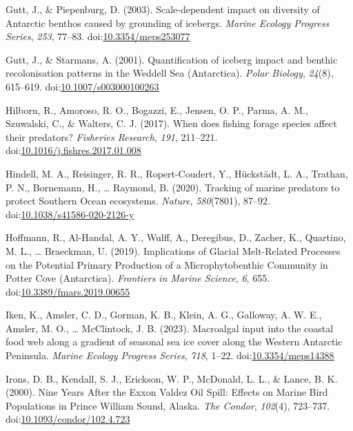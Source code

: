 \documentclass[
]{article}
\newlength{\cslhangindent}
\newenvironment{CSLReferences}[2] %
 {\begin{list}{}{%
  \setlength{\itemindent}{0pt}
  \setlength{\leftmargin}{0pt}
  \setlength{\parsep}{0pt}
  \ifodd #1
   \setlength{\leftmargin}{\cslhangindent}
   \setlength{\itemindent}{-1\cslhangindent}
  \fi
  \setlength{\itemsep}{#2\baselineskip}}}
 {\end{list}}
\begin{document}
\begin{CSLReferences}{1}{0}
Gutt, J., \& Piepenburg, D. (2003). Scale-dependent impact on diversity
of {Antarctic} benthos caused by grounding of icebergs. \emph{Marine
Ecology Progress Series}, \emph{253}, 77--83.
doi:\href{https://doi.org/10.3354/meps253077}{10.3354/meps253077}

Gutt, J., \& Starmans, A. (2001). Quantification of iceberg impact and
benthic recolonisation patterns in the {Weddell Sea} ({Antarctica}).
\emph{Polar Biology}, \emph{24}(8), 615--619.
doi:\href{https://doi.org/10.1007/s003000100263}{10.1007/s003000100263}

Hilborn, R., Amoroso, R. O., Bogazzi, E., Jensen, O. P., Parma, A. M.,
Szuwalski, C., \& Walters, C. J. (2017). When does fishing forage
species affect their predators? \emph{Fisheries Research}, \emph{191},
211--221.
doi:\href{https://doi.org/10.1016/j.fishres.2017.01.008}{10.1016/j.fishres.2017.01.008}

Hindell, M. A., Reisinger, R. R., Ropert-Coudert, Y., Hückstädt, L. A.,
Trathan, P. N., Bornemann, H., \ldots{} Raymond, B. (2020). Tracking of
marine predators to protect {Southern Ocean} ecosystems. \emph{Nature},
\emph{580}(7801), 87--92.
doi:\href{https://doi.org/10.1038/s41586-020-2126-y}{10.1038/s41586-020-2126-y}

Hoffmann, R., Al-Handal, A. Y., Wulff, A., Deregibus, D., Zacher, K.,
Quartino, M. L., \ldots{} Braeckman, U. (2019). Implications of {Glacial
Melt-Related Processes} on the {Potential Primary Production} of a
{Microphytobenthic Community} in {Potter Cove} ({Antarctica}).
\emph{Frontiers in Marine Science}, \emph{6}, 655.
doi:\href{https://doi.org/10.3389/fmars.2019.00655}{10.3389/fmars.2019.00655}

Iken, K., Amsler, C. D., Gorman, K. B., Klein, A. G., Galloway, A. W.
E., Amsler, M. O., \ldots{} McClintock, J. B. (2023). Macroalgal input
into the coastal food web along a gradient of seasonal sea ice cover
along the {Western Antarctic Peninsula}. \emph{Marine Ecology Progress
Series}, \emph{718}, 1--22.
doi:\href{https://doi.org/10.3354/meps14388}{10.3354/meps14388}

Irons, D. B., Kendall, S. J., Erickson, W. P., McDonald, L. L., \&
Lance, B. K. (2000). Nine {Years After} the {Exxon Valdez Oil Spill}:
{Effects} on {Marine Bird Populations} in {Prince William Sound},
{Alaska}. \emph{The Condor}, \emph{102}(4), 723--737.
doi:\href{https://doi.org/10.1093/condor/102.4.723}{10.1093/condor/102.4.723}


\end{CSLReferences}
\end{document}

